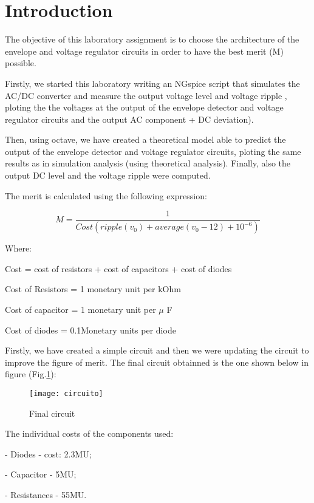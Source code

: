 \section{Introduction}
\label{sec:introduction}

The objective of this laboratory assignment is to choose the architecture of the envelope and voltage regulator circuits in order to have the best merit (M) possible. \par
Firstly, we started this laboratory writing an NGspice script that simulates the AC/DC converter and measure the output voltage level and voltage ripple , ploting the the voltages at the output of the envelope detector and voltage regulator circuits and the output AC component + DC deviation).\par
Then, using octave, we have created a theoretical model able to predict the output of the envelope detector and voltage regulator circuits, ploting the same results as in simulation analysis (using theoretical analysis). Finally, also the output DC level and the voltage ripple were computed. \par

The merit is calculated using the following expression:\par
\begin{equation}
    M = \frac{1}{Cost(ripple(v_0)+average(v_0-12)+10^{-6})}
\end{equation}\par
Where: \par
Cost = cost of resistors + cost of capacitors + cost of diodes \par
Cost of Resistors = 1 monetary unit per kOhm \par
Cost of capacitor = 1 monetary unit per $\mu$ F \par
Cost of diodes = 0.1Monetary units per diode \par
Firstly, we have created a simple circuit and then we were updating the circuit to improve the figure of merit. The final circuit obtainned is the one shown below in figure (Fig.\ref{fig:circuito}): \par

\begin{figure}[H]
\centering
\texttt{[image: circuito]}
\caption{Final circuit}
\label{fig:circuito}
\end{figure}

The individual costs of the components used: \par
- Diodes - cost: 2.3MU; \par
- Capacitor - 5MU; \par
- Resistances - 55MU. \par

